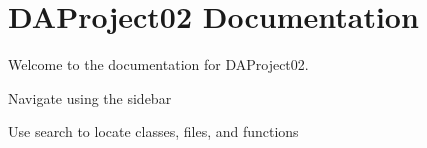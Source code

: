 \chapter{DAProject02 Documentation}
\hypertarget{index}{}\label{index}
Welcome to the documentation for DAProject02.


\begin{DoxyItemize}
\item Navigate using the sidebar
\item Use search to locate classes, files, and functions 
\end{DoxyItemize}